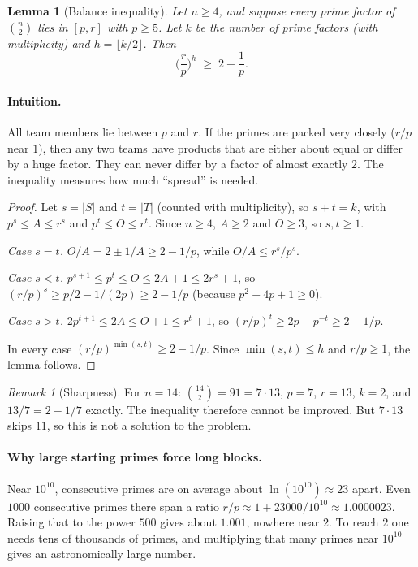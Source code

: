 \documentclass[11pt]{article}
\newtheorem{lemma}[theorem]{Lemma}
\theoremstyle{definition}
\theoremstyle{remark}
\newtheorem{remark}[theorem]{Remark}
\begin{document}
\begin{lemma}[Balance inequality]\label{lem:balance}
Let $n\ge 4$, and suppose every prime factor of $\binom{n}{2}$ lies in $[p,r]$ with $p\ge 5$.
Let $k$ be the number of prime factors (with multiplicity) and $h=\lfloor k/2\rfloor$. Then
\[
\Big(\frac{r}{p}\Big)^{h} \;\ge\; 2 - \frac1p .
\]
\end{lemma}

\paragraph{Intuition.} All team members lie between $p$ and $r$. If the primes are packed
very closely ($r/p$ near $1$), then any two teams have products that are either about equal
or differ by a huge factor. They can never differ by a factor of almost exactly $2$. The
inequality measures how much ``spread'' is needed.

\begin{proof}
Let $s=|S|$ and $t=|T|$ (counted with multiplicity), so $s+t=k$, with
$p^s \le A \le r^s$ and $p^t \le O \le r^t$. Since $n\ge 4$, $A\ge 2$ and $O\ge 3$, so
$s,t\ge 1$.

\emph{Case $s=t$.} $O/A = 2 \pm 1/A \ge 2 - 1/p$, while $O/A \le r^s/p^s$.

\emph{Case $s<t$.} $p^{s+1} \le p^t \le O \le 2A + 1 \le 2r^s+1$, so
$(r/p)^s \ge p/2 - 1/(2p) \ge 2 - 1/p$ (because $p^2-4p+1 \ge 0$).

\emph{Case $s>t$.} $2p^{t+1} \le 2A \le O + 1 \le r^t + 1$, so $(r/p)^t \ge 2p - p^{-t} \ge 2-1/p$.

In every case $(r/p)^{\min(s,t)} \ge 2-1/p$. Since $\min(s,t)\le h$ and $r/p\ge1$, the
lemma follows.
\end{proof}

\begin{remark}[Sharpness]
For $n=14$: $\binom{14}{2} = 91 = 7\cdot 13$, $p=7$, $r=13$, $k=2$, and $13/7 = 2-1/7$
exactly. The inequality therefore cannot be improved. But $7\cdot 13$ skips $11$, so this is
not a solution to the problem.
\end{remark}

\paragraph{Why large starting primes force long blocks.} Near $10^{10}$, consecutive primes
are on average about $\ln(10^{10}) \approx 23$ apart. Even $1000$ consecutive primes there
span a ratio $r/p \approx 1 + 23000/10^{10} \approx 1.0000023$. Raising that to the power
$500$ gives about $1.001$, nowhere near $2$. To reach $2$ one needs tens of thousands of
primes, and multiplying that many primes near $10^{10}$ gives an astronomically large number.
\end{document}
